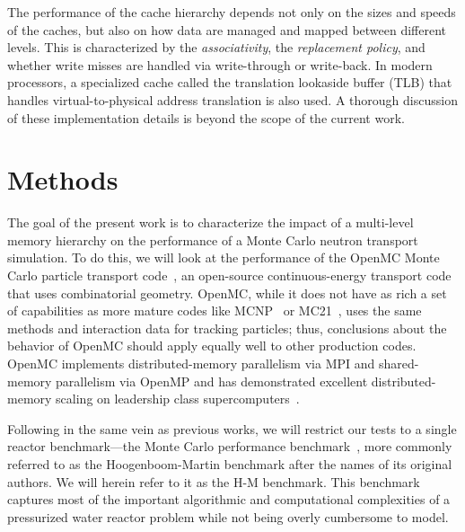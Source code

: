 \documentclass{mc2015}
\begin{document}
The performance of the cache hierarchy depends not only on the sizes and speeds
of the caches, but also on how data are managed and mapped between different
levels. This is characterized by the \emph{associativity}, the
\emph{replacement policy}, and whether write misses are handled via
write-through or write-back. In modern processors, a specialized cache called
the translation lookaside buffer (TLB) that handles virtual-to-physical address
translation is also used. A thorough discussion of these implementation details
is beyond the scope of the current work.

\section{Methods}

The goal of the present work is to characterize the impact of a multi-level
memory hierarchy on the performance of a Monte Carlo neutron transport
simulation. To do this, we will look at the performance of the OpenMC Monte
Carlo particle transport code~\cite{ane-romano-2013, ane-romano-2014}, an
open-source continuous-energy transport code that uses combinatorial
geometry. OpenMC, while it does not have as rich a set of capabilities as more
mature codes like MCNP~\cite{lanl-goorley-2014} or
MC21~\cite{ane-griesheimer-2014}, uses the same methods and interaction data
for tracking particles; thus, conclusions about the behavior of OpenMC should
apply equally well to other production codes. OpenMC implements
distributed-memory parallelism via MPI and shared-memory parallelism via OpenMP
and has demonstrated excellent distributed-memory scaling on leadership class
supercomputers~\cite{ane-romano-2013}.

Following in the same vein as previous works, we will restrict our tests to a
single reactor benchmark---the Monte Carlo performance
benchmark~\cite{mc-hoogenboom-2011}, more commonly referred to as the
Hoogenboom-Martin benchmark after the names of its original authors. We will
herein refer to it as the H-M benchmark. This benchmark captures most of the
important algorithmic and computational complexities of a pressurized water
reactor problem while not being overly cumbersome to model.
\end{document}

